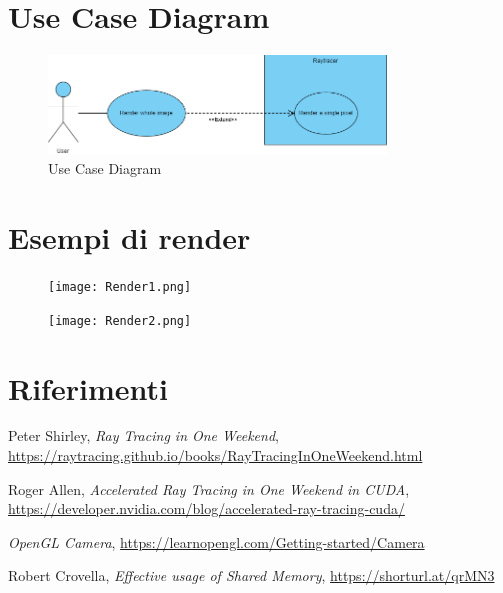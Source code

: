 \documentclass[12pt]{article}
\begin{document}
\newpage
\section{Use Case Diagram}
\begin{figure}[htbp]
  \centering
  \includegraphics[width=0.8\textwidth]{UseCaseDiagram.png}
  \caption{Use Case Diagram}
  \label{fig:use_case_diagram}
\end{figure}

\section{Esempi di render}

\begin{figure}[htbp]
  \centering
  \texttt{[image: Render1.png]}
  \label{fig:render1}
\end{figure}

\begin{figure}[htbp]
  \centering
  \texttt{[image: Render2.png]}
  \label{fig:render1}
\end{figure}


\newpage
\section{Riferimenti}

\begin{thebibliography}{99}
Peter Shirley,
\textit{Ray Tracing in One Weekend},
\url{https://raytracing.github.io/books/RayTracingInOneWeekend.html}

Roger Allen,
\textit{Accelerated Ray Tracing in One Weekend in CUDA},
\url{https://developer.nvidia.com/blog/accelerated-ray-tracing-cuda/}

\textit{OpenGL Camera},
\url{https://learnopengl.com/Getting-started/Camera}

Robert Crovella,
\textit{Effective usage of Shared Memory},
\url{https://shorturl.at/qrMN3}

\end{thebibliography}
\end{document}
